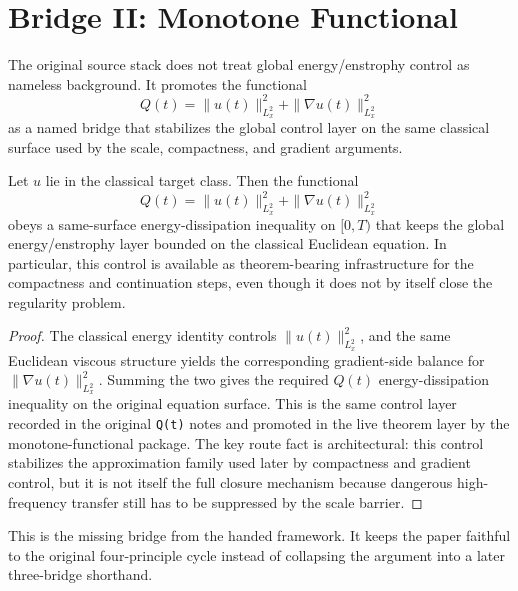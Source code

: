 \section{Bridge II: Monotone Functional}

The original source stack does not treat global energy/enstrophy control as nameless background. It promotes the functional
\[
Q(t)=\|u(t)\|_{L^2_x}^2+\|\nabla u(t)\|_{L^2_x}^2
\]
as a named bridge that stabilizes the global control layer on the same classical surface used by the scale, compactness, and gradient arguments.

\begin{proposition}
\label{prop:monotone-functional}
Let \(u\) lie in the classical target class. Then the functional
\[
Q(t)=\|u(t)\|_{L^2_x}^2+\|\nabla u(t)\|_{L^2_x}^2
\]
obeys a same-surface energy-dissipation inequality on \([0,T)\) that keeps the global energy/enstrophy layer bounded on the classical Euclidean equation. In particular, this control is available as theorem-bearing infrastructure for the compactness and continuation steps, even though it does not by itself close the regularity problem.
\end{proposition}

\begin{proof}
The classical energy identity controls \(\|u(t)\|_{L^2_x}^2\), and the same Euclidean viscous structure yields the corresponding gradient-side balance for \(\|\nabla u(t)\|_{L^2_x}^2\). Summing the two gives the required \(Q(t)\) energy-dissipation inequality on the original equation surface. This is the same control layer recorded in the original \texttt{Q(t)} notes and promoted in the live theorem layer by the monotone-functional package. The key route fact is architectural: this control stabilizes the approximation family used later by compactness and gradient control, but it is not itself the full closure mechanism because dangerous high-frequency transfer still has to be suppressed by the scale barrier.
\end{proof}

This is the missing bridge from the handed framework. It keeps the paper faithful to the original four-principle cycle instead of collapsing the argument into a later three-bridge shorthand.
